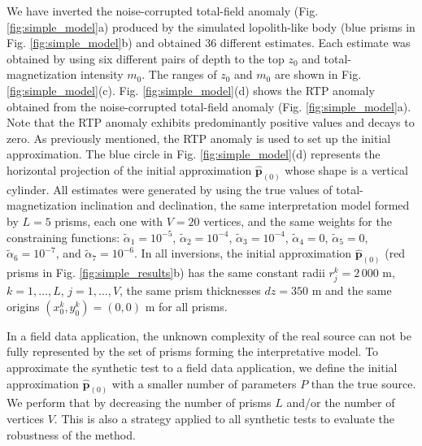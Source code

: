 We have inverted the noise-corrupted total-field anomaly (Fig. \ref{fig:simple_model}a) produced by the simulated lopolith-like body (blue prisms in Fig. \ref{fig:simple_model}b) and obtained 36 different estimates. 
Each estimate was obtained by using six different pairs of depth to the top $ z_0 $ and total-magnetization intensity $ m_0 $.
The ranges of $ z_0 $ and $ m_0 $ are shown in Fig. \ref{fig:simple_model}(c). 
Fig. \ref{fig:simple_model}(d) shows the RTP anomaly obtained from the noise-corrupted 
total-field anomaly (Fig. \ref{fig:simple_model}a).
Note that the RTP anomaly exhibits predominantly positive values and decays to zero.
As previously mentioned, the RTP anomaly is used to set up the initial approximation. 
The blue circle in Fig. \ref{fig:simple_model}(d) represents the horizontal projection 
of the initial approximation $\hat{\mathbf{p}}_{(0)}$ whose shape is a vertical cylinder.
All estimates were generated by using the true values of total-magnetization inclination and declination, the same interpretation model formed by $ L = 5 $ prisms, 
each one with $ V = 20 $ vertices, and the same weights for the constraining functions: 
$\tilde{\alpha}_1 = 10^{-5}$, 
$\tilde{\alpha}_2 = 10^{-4}$, 
$\tilde{\alpha}_3 = 10^{-4}$, 
$\tilde{\alpha}_4 = 0$, 
$\tilde{\alpha}_5 = 0$, 
$\tilde{\alpha}_6 = 10^{-7}$, and 
$\tilde{\alpha}_7 = 10^{-6}$. 
In all inversions, the initial approximation $\hat{\mathbf{p}}_{(0)}$ (red prisms in Fig. \ref{fig:simple_results}b) has the same constant radii $ r^k_j = 2\,000 $ m, 
$ k = 1, \dots, L $, $ j = 1, \dots, V $, the same prism thicknesses $ dz = 350 $ m and the same origins $(x^k_0, y^k_0) = (0, 0) $ m for all prisms.

In a field data application, the unknown complexity of the real source can not be fully represented by the set of prisms forming the interpretative model. To approximate the synthetic test to a field data application, we define the initial approximation $\hat{\mathbf{p}}_{(0)}$ with a smaller number of parameters $ P $ than the true source. We perform that by decreasing the number of prisms $ L $ and/or the number of vertices $ V $. This is also a strategy applied to all synthetic tests to evaluate the robustness of the method. 

